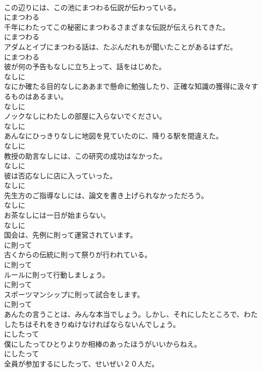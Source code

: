 \documentclass[8pt]{extreport}
\begin{document}
\begin{CJK}{UTF8}{min}
\\	この辺りには、この池にまつわる伝説が伝わっている。	
\\	にまつわる	
\\	千年にわたってこの秘密にまつわるさまざまな伝説が伝えられてきた。	
\\	にまつわる	
\\	アダムとイブにまつわる話は、たぶんだれもが聞いたことがあるはずだ。	
\\	にまつわる	
\\	彼が何の予告もなしに立ち上って、話をはじめた。	
\\	なしに	
\\	なにか確たる目的なしにああまで懸命に勉強したり、正確な知識の獲得に汲々するものはあるまい。	
\\	なしに	
\\	ノックなしにわたしの部屋に入らないでください。	
\\	なしに	
\\	あんなにひっきりなしに地図を見ていたのに、降りる駅を間違えた。	
\\	なしに	
\\	教授の助言なしには、この研究の成功はなかった。	
\\	なしに	
\\	彼は否応なしに店に入っていった。	
\\	なしに	
\\	先生方のご指導なしには、論文を書き上げられなかっただろう。	
\\	なしに	
\\	お茶なしには一日が始まらない。	
\\	なしに	
\\	国会は、先例に則って運営されています。	
\\	に則って	
\\	古くからの伝統に則って祭りが行われている。	
\\	に則って	
\\	ルールに則って行動しましょう。	
\\	に則って	
\\	スポーツマンシップに則って試合をします。	
\\	に則って	
\\	あんたの言うことは、みんな本当でしょう。しかし、それにしたところで、わたしたちはそれをきりぬけなければならないんでしょう。	
\\	にしたって	
\\	僕にしたってひとりよりか相棒のあったほうがいいからねえ。	
\\	にしたって	
\\	全員が参加するにしたって、せいぜい２０人だ。	

\end{CJK}
\end{document}
